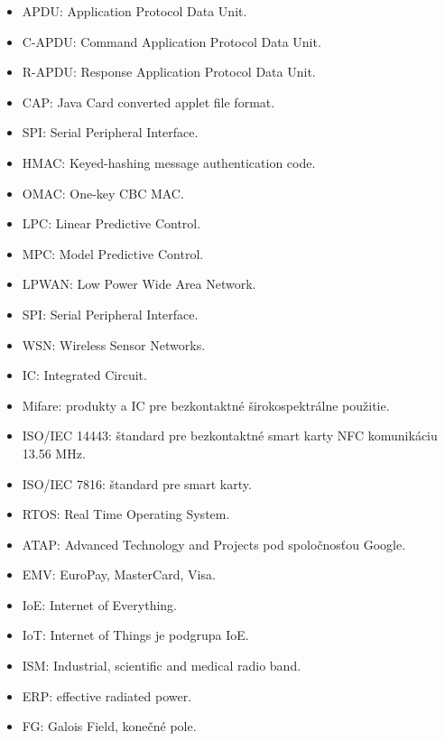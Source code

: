 \documentclass[12pt,a4paper,oneside,openright]{report}
\begin{document}
\begin{itemize}
	\item APDU: Application Protocol Data Unit.
	\item C-APDU: Command Application Protocol Data Unit.
	\item R-APDU: Response Application Protocol Data Unit.
	\item CAP: Java Card converted applet file format.
	\item SPI: Serial Peripheral Interface.
	\item HMAC: Keyed-hashing message authentication code.
	\item OMAC: One-key CBC MAC.
	\item LPC: Linear Predictive Control.
	\item MPC: Model Predictive Control.
	\item LPWAN: Low Power Wide Area Network.
	\item SPI: Serial Peripheral Interface.	
	\item WSN: Wireless Sensor Networks.
	\item IC: Integrated Circuit.
	\item Mifare: produkty a IC pre bezkontaktné širokospektrálne použitie.
	\item ISO/IEC 14443: štandard pre bezkontaktné smart karty NFC komunikáciu 13.56 MHz.
	\item ISO/IEC 7816: štandard pre smart karty.
	\item RTOS: Real Time Operating System.
	\item ATAP: Advanced Technology and Projects pod spoločnosťou Google.
	\item EMV: EuroPay, MasterCard, Visa.
	\item IoE: Internet of Everything.
	\item IoT: Internet of Things je podgrupa IoE.
	\item ISM: Industrial, scientific and medical radio band.
	\item ERP: effective radiated power.
	\item FG: Galois Field, konečné pole.
\end{itemize}
\onehalfspacing
\end{document}
